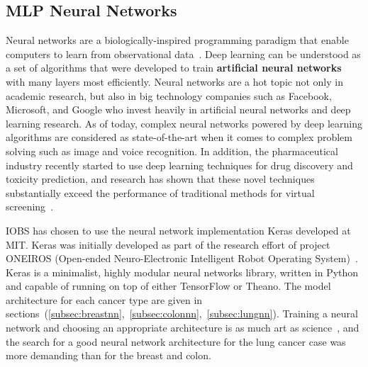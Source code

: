 \documentclass[a4paper,11pt]{article}
\begin{document}
\subsection{MLP Neural Networks}


Neural networks are a biologically-inspired programming paradigm that enable computers to learn from observational data~\cite{deeplearning}.
Deep learning can be understood as a set of algorithms that were developed to train \textbf{artificial neural networks} with many layers most efficiently.
 Neural networks are a hot topic not only in academic research, but also in big technology companies such as Facebook, Microsoft, and Google who invest heavily in artificial neural networks and deep learning research. As of today, complex neural networks powered by deep learning algorithms are considered as state-of-the-art when it comes to complex problem solving such as image and voice recognition.
In addition, the pharmaceutical industry recently started to use deep learning techniques for drug discovery and toxicity prediction, and research has shown that these novel techniques substantially exceed the performance of traditional methods for virtual screening~\cite{toxicity}.

IOBS has chosen to use the neural network implementation Keras developed at MIT.
Keras was initially developed as part of the research effort of project ONEIROS (Open-ended Neuro-Electronic Intelligent Robot Operating System)~\cite{keras}.
Keras is a minimalist, highly modular neural networks library, written in Python and capable of running on top of either TensorFlow or Theano. The model architecture for each cancer type are given in sections~(\ref{subsec:breastnn},~\ref{subsec:colonnn},~\ref{subsec:lungnn}). Training a neural network and choosing an appropriate architecture is as much art as science~\cite{deeplearning}, and the search for a good neural network architecture for the lung cancer case was more demanding than for the breast and colon. 



















\end{document}
